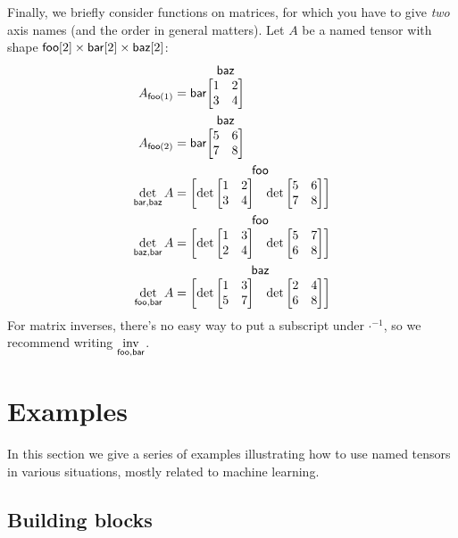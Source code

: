 \documentclass{article}
\makeatletter
\newcommand{\nmatrix}[3]{\name{#1}\begin{array}[b]{@{}c@{}}\name{#2}\\\begin{bmatrix}#3\end{bmatrix}\end{array}}
\makeatother
\begin{document}
Finally, we briefly consider functions on matrices, for which you have to give \emph{two} axis names (and the order in general matters). Let $A$ be a named tensor with shape $\mathsf{foo}[2] \times\mathsf{bar}[2] \times\mathsf{baz}[2]$:
\begin{align*}
A_{\nidx{foo}{1}} &= \nmatrix{bar}{baz}{
  1 & 2 \\
  3 & 4
} \\
A_{\nidx{foo}{2}} &= \nmatrix{bar}{baz}{
  5 & 6 \\
  7 & 8
} \\
\nfun{bar,baz}{det} A &= \nmatrix{}{foo}{\det \begin{bmatrix} 1 & 2 \\ 3 & 4 \end{bmatrix} & \det \begin{bmatrix} 5 & 6 \\ 7 & 8 \end{bmatrix}} \\
\nfun{baz,bar}{det} A &= \nmatrix{}{foo}{\det \begin{bmatrix} 1 & 3 \\ 2 & 4 \end{bmatrix} & \det \begin{bmatrix} 5 & 7 \\ 6 & 8 \end{bmatrix}} \\
\nfun{foo,bar}{det} A &= \nmatrix{}{baz}{\det \begin{bmatrix} 1 & 3 \\ 5 & 7 \end{bmatrix} & \det \begin{bmatrix} 2 & 4 \\ 6 & 8 \end{bmatrix}}
\end{align*}
For matrix inverses, there's no easy way to put a subscript under $\mathord\cdot^{-1}$, so we recommend writing $\mathop{\underset{\mathsf{foo,bar}}{\mathrm{inv}}}$.

\section{Examples}
\label{sec:examples}

In this section we give a series of examples illustrating how to use named tensors in various situations, mostly related to machine learning.

\subsection{Building blocks}
\end{document}
